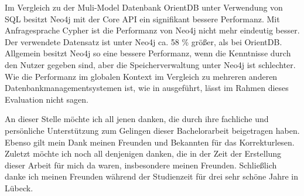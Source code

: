 Im Vergleich zu der Muli-Model Datenbank OrientDB unter Verwendung von SQL besitzt Neo4j mit der Core API ein signifikant bessere Performanz. Mit  Anfragesprache Cypher ist die Performanz von Neo4j nicht mehr eindeutig besser. Der verwendete Datensatz ist unter Neo4j ca. 58 \% größer, als bei OrientDB. Allgemein besitzt Neo4j so eine bessere Performanz, wenn die Kenntnisse durch den Nutzer gegeben sind, aber die Speicherverwaltung unter Neo4j ist schlechter. Wie die Performanz im globalen Kontext im Vergleich zu mehreren anderen Datenbankmanagementsystemen ist, wie in \parencite{jouili2013empirical} ausgeführt,  lässt im Rahmen dieses Evaluation nicht sagen. 

\begin{acknowledgements}
	An dieser Stelle möchte ich all jenen danken, die durch ihre fachliche und persönliche Unterstützung zum Gelingen dieser Bachelorarbeit beigetragen haben. \newline \newline
	Ebenso gilt mein Dank meinen Freunden und Bekannten für das Korrekturlesen. Zuletzt möchte ich noch all denjenigen danken, die in der Zeit der Erstellung dieser Arbeit für mich da waren, insbesondere meinen Freunden. \newline \newline
	Schließlich danke ich meinen Freunden während der Studienzeit für drei sehr schöne Jahre in Lübeck.
\end{acknowledgements}